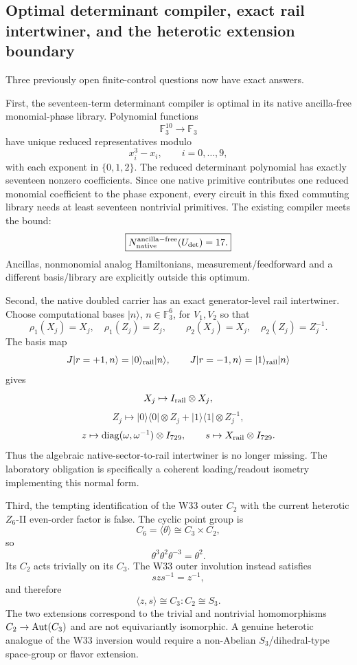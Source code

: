 \subsection{Optimal determinant compiler, exact rail intertwiner, and the heterotic extension boundary}
\label{sec:20260918-optimal-det-rail-c2-boundary}

Three previously open finite-control questions now have exact answers.

First, the seventeen-term determinant compiler is optimal in its native
ancilla-free monomial-phase library.  Polynomial functions
\[
\mathbb F_3^{10}\longrightarrow\mathbb F_3
\]
have unique reduced representatives modulo
\[
x_i^3-x_i,\qquad i=0,\ldots,9,
\]
with each exponent in \(\{0,1,2\}\).  The reduced determinant polynomial has
exactly seventeen nonzero coefficients.  Since one native primitive contributes
one reduced monomial coefficient to the phase exponent, every circuit in this
fixed commuting library needs at least seventeen nontrivial primitives.  The
existing compiler meets the bound:
\[
\boxed{N_{\rm native}^{\rm ancilla-free}(U_{\det})=17.}
\]
Ancillas, nonmonomial analog Hamiltonians, measurement/feedforward and a
different basis/library are explicitly outside this optimum.

Second, the native doubled carrier has an exact generator-level rail
intertwiner.  Choose computational bases \(|n\rangle\), \(n\in\mathbb F_3^6\),
for \(V_1,V_2\) so that
\[
\rho_1(X_j)=X_j,\quad \rho_1(Z_j)=Z_j,\qquad
\rho_2(X_j)=X_j,\quad \rho_2(Z_j)=Z_j^{-1}.
\]
The basis map
\[
J|r=+1,n\rangle=|0\rangle_{\rm rail}|n\rangle,\qquad
J|r=-1,n\rangle=|1\rangle_{\rm rail}|n\rangle
\]
gives
\[
X_j\mapsto I_{\rm rail}\otimes X_j,
\]
\[
Z_j\mapsto |0\rangle\!\langle0|\otimes Z_j
          +|1\rangle\!\langle1|\otimes Z_j^{-1},
\]
\[
z\mapsto {\rm diag}(\omega,\omega^{-1})\otimes I_{729},\qquad
s\mapsto X_{\rm rail}\otimes I_{729}.
\]
Thus the algebraic native-sector-to-rail intertwiner is no longer missing.
The laboratory obligation is specifically a coherent loading/readout isometry
implementing this normal form.

Third, the tempting identification of the W33 outer \(C_2\) with the current
heterotic \(Z_6\)-II even-order factor is false.  The cyclic point group is
\[
C_6=\langle\theta\rangle\cong C_3\times C_2,
\]
so
\[
\theta^3\theta^2\theta^{-3}=\theta^2.
\]
Its \(C_2\) acts trivially on its \(C_3\).  The W33 outer involution instead
satisfies
\[
s z s^{-1}=z^{-1},
\]
and therefore
\[
\langle z,s\rangle\cong C_3{:}C_2\cong S_3.
\]
The two extensions correspond to the trivial and nontrivial homomorphisms
\(C_2\to{\rm Aut}(C_3)\) and are not equivariantly isomorphic.  A genuine
heterotic analogue of the W33 inversion would require a non-Abelian
\(S_3\)/dihedral-type space-group or flavor extension.

